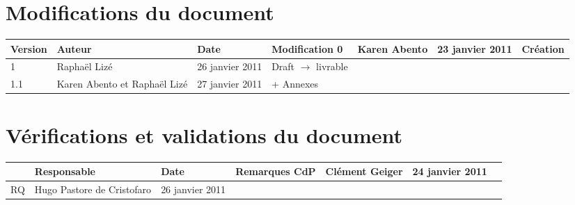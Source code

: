 
\section*{Modifications du document}

\begin{center}
\begin{longtable}{|m{14mm}||m{36mm}|m{36mm}|m{60mm}|}
\hline
Version & Auteur & Date & Modification\endhead \hline
0
& %
Karen Abento
& %
23 janvier 2011
& %
Création
\\\hline
1
& %
Raphaël Lizé
& %
26 janvier 2011
& %
Draft $\rightarrow$ livrable
\\\hline
1.1
& %
Karen Abento et Raphaël Lizé
& %
27 janvier 2011
& %
+ Annexes
\\\hline
\end{longtable}
\end{center}


\section*{Vérifications et validations du document}

\begin{center}
\begin{longtable}{|m{15mm}|m{36mm}|m{36mm}|m{60mm}|}
\hline
 & Responsable & Date & Remarques\endhead \hline
CdP
& %
Clément Geiger
& %
24 janvier 2011
& %

\\\hline
RQ
& %
Hugo Pastore de Cristofaro
& %
26 janvier 2011
& %

\\\hline
\end{longtable}
\end{center}

\pagebreak
